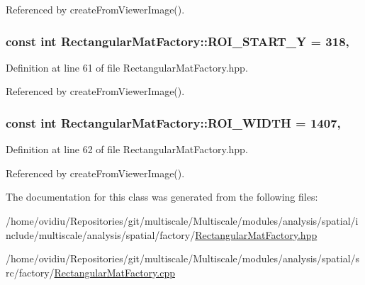 Referenced by create\-From\-Viewer\-Image().

\hypertarget{classmultiscale_1_1analysis_1_1RectangularMatFactory_a1a25934dba59fe883d88e9735eb33db6}{
\subsubsection[{R\-O\-I\-\_\-\-S\-T\-A\-R\-T\-\_\-\-Y}]{\setlength{\rightskip}{0pt plus 5cm}const int Rectangular\-Mat\-Factory\-::\-R\-O\-I\-\_\-\-S\-T\-A\-R\-T\-\_\-\-Y = 318\hspace{0.3cm}{\ttfamily [static]}, {\ttfamily [private]}}}\label{classmultiscale_1_1analysis_1_1RectangularMatFactory_a1a25934dba59fe883d88e9735eb33db6}


Definition at line 61 of file Rectangular\-Mat\-Factory.\-hpp.



Referenced by create\-From\-Viewer\-Image().

\hypertarget{classmultiscale_1_1analysis_1_1RectangularMatFactory_aeb6f19ae65802df5f876cd0e15b27a48}{
\subsubsection[{R\-O\-I\-\_\-\-W\-I\-D\-T\-H}]{\setlength{\rightskip}{0pt plus 5cm}const int Rectangular\-Mat\-Factory\-::\-R\-O\-I\-\_\-\-W\-I\-D\-T\-H = 1407\hspace{0.3cm}{\ttfamily [static]}, {\ttfamily [private]}}}\label{classmultiscale_1_1analysis_1_1RectangularMatFactory_aeb6f19ae65802df5f876cd0e15b27a48}


Definition at line 62 of file Rectangular\-Mat\-Factory.\-hpp.



Referenced by create\-From\-Viewer\-Image().



The documentation for this class was generated from the following files\-:\begin{DoxyCompactItemize}
\item 
/home/ovidiu/\-Repositories/git/multiscale/\-Multiscale/modules/analysis/spatial/include/multiscale/analysis/spatial/factory/\hyperlink{RectangularMatFactory_8hpp}{Rectangular\-Mat\-Factory.\-hpp}\item 
/home/ovidiu/\-Repositories/git/multiscale/\-Multiscale/modules/analysis/spatial/src/factory/\hyperlink{RectangularMatFactory_8cpp}{Rectangular\-Mat\-Factory.\-cpp}\end{DoxyCompactItemize}
